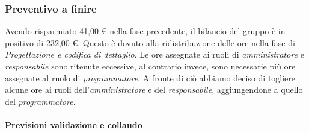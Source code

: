 \documentclass[../piano_di_progetto.tex]{subfiles}
\begin{document}
\subsubsection{Preventivo a finire}
\label{sub:cons_prev_fine_4} 
Avendo risparmiato 41,00 € nella fase precedente, il bilancio del gruppo è in positivo di 232,00 €. Questo è dovuto alla ridistribuzione delle ore nella fase di \emph{Progettazione e codifica di dettaglio}. Le ore assegnate ai ruoli di \emph{amministratore} e \emph{responsabile} sono ritenute eccessive, al contrario invece, sono necessarie più ore assegnate al ruolo di \emph{programmatore}. A fronte di ciò abbiamo deciso di togliere alcune ore ai ruoli dell'\emph{amministratore} e del \emph{responsabile}, aggiungendone a quello del \emph{programmatore}. 

\paragraph*{Previsioni validazione e collaudo}
\end{document}
